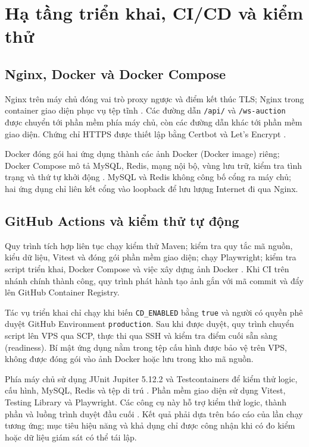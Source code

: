 \documentclass[../DoAn.tex]{subfiles}
\begin{document}
\section{Hạ tầng triển khai, CI/CD và kiểm thử}

\subsection{Nginx, Docker và Docker Compose}

Nginx trên máy chủ đóng vai trò proxy ngược và điểm kết thúc TLS; Nginx trong container giao diện phục vụ tệp tĩnh \cite{nginxdocs}. Các đường dẫn \texttt{/api/} và \texttt{/ws-auction} được chuyển tới phần mềm phía máy chủ, còn các đường dẫn khác tới phần mềm giao diện. Chứng chỉ HTTPS được thiết lập bằng Certbot và Let's Encrypt \cite{certbotdocs}.

Docker đóng gói hai ứng dụng thành các ảnh Docker (Docker image) riêng; Docker Compose mô tả MySQL, Redis, mạng nội bộ, vùng lưu trữ, kiểm tra tình trạng và thứ tự khởi động \cite{dockerdocs,composedocs}. MySQL và Redis không công bố cổng ra máy chủ; hai ứng dụng chỉ liên kết cổng vào loopback để lưu lượng Internet đi qua Nginx.

\subsection{GitHub Actions và kiểm thử tự động}

Quy trình tích hợp liên tục chạy kiểm thử Maven; kiểm tra quy tắc mã nguồn, kiểu dữ liệu, Vitest và đóng gói phần mềm giao diện; chạy Playwright; kiểm tra script triển khai, Docker Compose và việc xây dựng ảnh Docker \cite{actionsdocs}. Khi CI trên nhánh chính thành công, quy trình phát hành tạo ảnh gắn với mã commit và đẩy lên GitHub Container Registry.

Tác vụ triển khai chỉ chạy khi biến \texttt{CD\_ENABLED} bằng \texttt{true} và người có quyền phê duyệt GitHub Environment \texttt{production}. Sau khi được duyệt, quy trình chuyển script lên VPS qua SCP, thực thi qua SSH và kiểm tra điểm cuối sẵn sàng (readiness). Bí mật ứng dụng nằm trong tệp cấu hình được bảo vệ trên VPS, không được đóng gói vào ảnh Docker hoặc lưu trong kho mã nguồn.

Phía máy chủ sử dụng JUnit Jupiter 5.12.2 và Testcontainers để kiểm thử logic, cấu hình, MySQL, Redis và tệp di trú \cite{junitdocs,testcontainersdocs}. Phần mềm giao diện sử dụng Vitest, Testing Library và Playwright. Các công cụ này hỗ trợ kiểm thử logic, thành phần và luồng trình duyệt đầu cuối \cite{vitestdocs,playwrightdocs}. Kết quả phải dựa trên báo cáo của lần chạy tương ứng; mục tiêu hiệu năng và khả dụng chỉ được công nhận khi có đo kiểm hoặc dữ liệu giám sát có thể tái lập.
\end{document}

